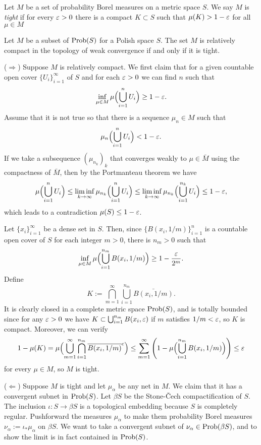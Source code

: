 \documentclass{../../small}
\begin{document}
\begin{defn}
Let $M$ be a set of probability Borel measures on a metric space $S$.
We say $M$ is \emph{tight} if for every $\varepsilon>0$ there is a compact $K\subset S$ such that $\mu(K)>1-\varepsilon$ for all $\mu\in M$
\end{defn}
\begin{thm}
Let $M$ be a subset of $\operatorname{Prob}(S)$ for a Polish space $S$.
The set $M$ is relatively compact in the topology of weak convergence if and only if it is tight.
\end{thm}
\begin{pf}
($\Rightarrow$)
Suppose $M$ is relatively compact.
We first claim that for a given countable open cover $\{U_i\}_{i=1}^\infty$ of $S$ and for each $\varepsilon>0$ we can find $n$ such that
\[\inf_{\mu\in M}\mu\Bigl(\bigcup_{i=1}^nU_i\Bigr)\ge1-\varepsilon.\]
Assume that it is not true so that there is a sequence $\mu_n\in M$ such that
\[\mu_n\Bigl(\bigcup_{i=1}^nU_i\Bigr)<1-\varepsilon.\]
If we take a subsequence $(\mu_{n_k})_k$ that converges weakly to $\mu\in\bar M$ using the compactness of $\bar M$, then by the Portmanteau theorem we have
\[\mu\Bigl(\bigcup_{i=1}^nU_i\Bigr)\le\liminf_{k\to\infty}\mu_{n_k}\Bigl(\bigcup_{i=1}^nU_i\Bigr)\le\liminf_{k\to\infty}\mu_{n_k}\Bigl(\bigcup_{i=1}^{n_k}U_i\Bigr)\le1-\varepsilon,\]
which leads to a contradiction $\mu(S)\le1-\varepsilon$.

Let $\{x_i\}_{i=1}^\infty$ be a dense set in $S$.
Then, since $\{B(x_i,1/m)\}_{i=1}^n$ is a countable open cover of $S$ for each integer $m>0$, there is $n_m>0$ such that
\[\inf_{\mu\in M}\mu\Bigl(\bigcup_{i=1}^{n_m}B(x_i,1/m)\Bigr)\ge1-\frac{\varepsilon}{2^m}.\]
Define
\[K:=\bigcap_{m=1}^\infty\bigcup_{i=1}^{n_m}\bar{B(x_i,1/m)}.\]
It is clearly closed in a complete metric space $\operatorname{Prob}(S)$, and is totally bounded since for any $\varepsilon>0$ we have $K\subset\bigcup_{i=1}^{n_m}B(x_i,\varepsilon)$ if $m$ satisfies $1/m<\varepsilon$, so $K$ is compact.
Moreover, we can verify
\[1-\mu(K)=\mu\Bigl(\bigcup_{m=1}^\infty\bigcap_{i=1}^{n_m}\overline{B(x_i,1/m)}^c\Bigr)\le\sum_{m=1}^\infty\left(1-\mu\Bigl(\bigcup_{i=1}^{n_m}B(x_i,1/m)\Bigr)\right)\le\varepsilon\]
for every $\mu\in M$, so $M$ is tight.

($\Leftarrow$)
Suppose $M$ is tight and let $\mu_\alpha$ be any net in $M$.
We claim that it has a convergent subnet in $\operatorname{Prob}(S)$.
Let $\beta S$ be the Stone-\v Cech compactification of $S$.
The inclusion $\iota:S\to\beta S$ is a topological embedding because $S$ is completely regular.
Pushforward the measures $\mu_\alpha$ to make them probability Borel measures $\nu_\alpha:=\iota_*\mu_\alpha$ on $\beta S$.
We want to take a convergent subnet of $\nu_\alpha\in\operatorname{Prob}(\beta S)$, and to show the limit is in fact contained in $\operatorname{Prob}(S)$.


\end{pf}
\end{document}
